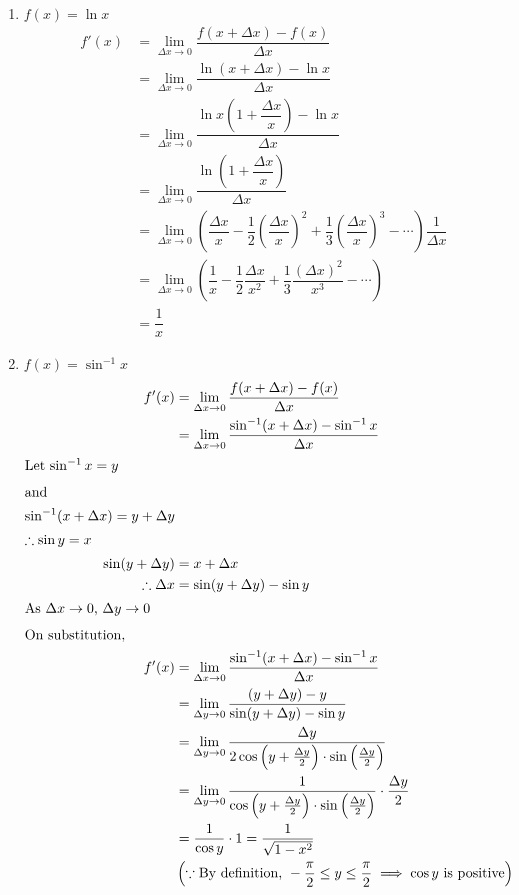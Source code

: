 \begin{enumerate}
    \item $f(x) = \ln x$
        \begin{align*}
            f'(x) &= \lim_{\Delta x \to 0} \dfrac{f(x+\Delta x) - f(x)}{\Delta x} \\
            &= \lim_{\Delta x \to 0} \dfrac{\ln (x+\Delta x) - \ln x}{\Delta x} \\
            &= \lim_{\Delta x \to 0} \dfrac{\ln x \left( 1 + \dfrac{\Delta x}{x} \right) - \ln x}{\Delta x} \\
            &= \lim_{\Delta x \to 0} \dfrac{\ln\left( 1 + \dfrac{\Delta x}{x} \right)}{\Delta x} \\
            &= \lim_{\Delta x \to 0} \left( \dfrac{\Delta x}{x} - \dfrac{1}{2} \left( \dfrac{\Delta x}{x} \right)^2 
            + \dfrac{1}{3} \left( \dfrac{\Delta x}{x} \right)^3 - \cdots \right) \dfrac{1}{\Delta x} \\
            &= \lim_{\Delta x \to 0} \left( \dfrac{1}{x} - \dfrac{1}{2} \dfrac{\Delta x}{x^2} 
            + \dfrac{1}{3} \dfrac{(\Delta x)^2}{x^3} - \cdots \right) \\
            &= \dfrac{1}{x}
        \end{align*}
        
    \item $f(x) = \sin^{-1} x$
        \begin{align*}
            f'(x) &= \lim_{\Delta x \to 0} \dfrac{f(x+\Delta x) - f(x)}{\Delta x}\\
            &= \lim_{\Delta x \to 0} \dfrac{\sin^{-1} (x + \Delta x) - \sin^{-1} x}{\Delta x}\\
            \intertext{Let $\sin^{-1} x = y$}
            \intertext{and}
            \sin^{-1}(x + \Delta x) = y + \Delta y\\
            \intertext{$\therefore \sin y = x$}
            \sin(y + \Delta y) &= x + \Delta x\\
            \therefore \Delta x &= \sin(y + \Delta y) - \sin y\\
            \intertext{As $\Delta x \to 0$, $\Delta y \to 0$}
            \intertext{On substitution,}
            f'(x) &= \lim_{\Delta x \to 0} \frac{\sin^{-1}(x + \Delta x) - \sin^{-1} x}{\Delta x} \\
            &= \lim_{\Delta y \to 0} \frac{(y + \Delta y) - y}{\sin(y + \Delta y) - \sin y} \\
            &= \lim_{\Delta y \to 0} \frac{\Delta y}{2 \cos \left( y + \frac{\Delta y}{2} \right) \cdot \sin \left( \frac{\Delta y}{2} \right)} \\
            &= \lim_{\Delta y \to 0} \frac{1}{\cos \left( y + \frac{\Delta y}{2} \right) \cdot \sin \left( \frac{\Delta y}{2} \right)} \cdot \frac{\Delta y}{2} \\
            &= \frac{1}{\cos y} \cdot 1 = \frac{1}{\sqrt{1-x^2}} \\
            &\left(\because \text{By definition, } -\frac{\pi}{2} \le y \le \frac{\pi}{2} \implies \cos y \text{ is positive}\right)
        \end{align*}
        

\end{enumerate}
